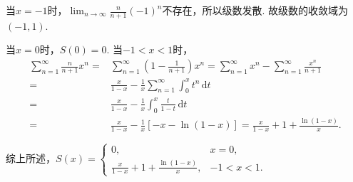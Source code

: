 \documentclass[../main.tex]{subfiles}
\begin{document}
\begin{enumerate}
          当$x=-1$时，$\lim_{n\to\infty}\frac{n}{n+1}(-1)^n$不存在，所以级数发散. 故级数的收敛域为$(-1,1)$.

          当$x=0$时，$S(0)=0$. 当$-1<x<1$时，
          \[
              \begin{aligned}
                  \sum_{n=1}^{\infty}\frac{n}{n+1}x^n = {} & \sum_{n=1}^{\infty}\left(1-\frac{1}{n+1}\right)x^n = \sum_{n=1}^{\infty}x^n - \sum_{n=1}^{\infty}\frac{x^n}{n+1} \\
                  = {}                                     & \frac{x}{1-x} - \frac{1}{x}\sum_{n=1}^{\infty}\int_{0}^{x}t^n\,\mathrm{d}t                                       \\
                  = {}                                     & \frac{x}{1-x} - \frac{1}{x}\int_{0}^{x}\frac{t}{1-t}\,\mathrm{d}t                                                \\
                  = {}                                     & \frac{x}{1-x} - \frac{1}{x}\left[-x-\ln(1-x)\right] = \frac{x}{1-x} + 1 + \frac{\ln(1-x)}{x}.
              \end{aligned}
          \]

          综上所述，$S(x)=\begin{cases}
                  0,                                      & x=0,    \\
                  \frac{x}{1-x} + 1 + \frac{\ln(1-x)}{x}, & -1<x<1.
              \end{cases}$

\end{enumerate}
\end{document}
